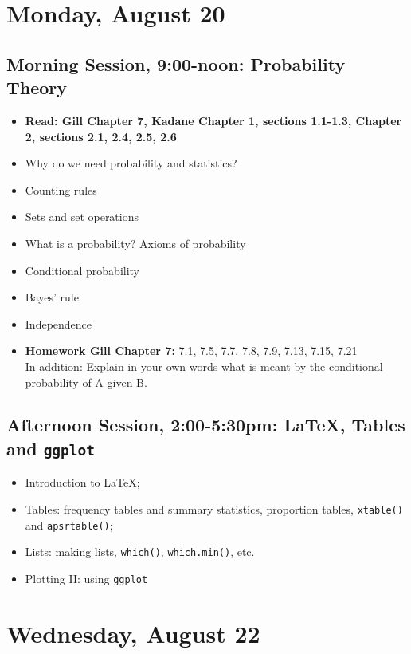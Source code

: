 \documentclass[12pt,a4paper]{article}
\begin{document}
\section*{Monday, August 20}

\subsection*{Morning Session, 9:00-noon: Probability Theory}
\begin{itemize}
\setlength{\itemsep}{0pt}
\footnotesize
\item \textbf{Read: Gill Chapter 7, Kadane Chapter 1, sections 1.1-1.3, Chapter 2, sections 2.1, 2.4, 2.5, 2.6}
\item Why do we need probability and statistics?
\item Counting rules
\item Sets and set operations
\item What is a probability? Axioms of probability
\item Conditional probability
\item Bayes' rule
\item Independence
\item \textbf{Homework Gill Chapter 7:} 7.1, 7.5, 7.7, 7.8, 7.9, 7.13, 7.15, 7.21\\ In addition: Explain in your own words what is meant by the conditional probability of A given B.
\end{itemize}


\subsection*{Afternoon Session, 2:00-5:30pm: \LaTeX, Tables and \texttt{ggplot}}
\begin{itemize}
\setlength{\itemsep}{0pt}
\footnotesize
\item Introduction to \LaTeX;
\item Tables: frequency tables and summary statistics, proportion tables, \texttt{xtable()} and \texttt{apsrtable()};
\item Lists: making lists, \texttt{which()}, \texttt{which.min()}, etc.
\item Plotting II: using \texttt{ggplot}
\end{itemize}

\section*{Wednesday, August 22}
\end{document}
